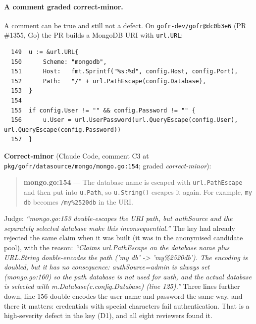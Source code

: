 \documentclass[11pt,a4paper]{article}
\newcommand{\code}[1]{\texttt{#1}}
\begin{document}
\paragraph{A comment graded correct-minor.} A comment can be true and
still not a defect. On \code{gofr-dev/\allowbreak{}gofr@dc0b3e6} (PR \#1355, Go) the PR
builds a MongoDB URI with \code{url.URL}:
{\scriptsize
\begin{verbatim}
  149  u := &url.URL{
  150      Scheme: "mongodb",
  151      Host:   fmt.Sprintf("%s:%d", config.Host, config.Port),
  152      Path:   "/" + url.PathEscape(config.Database),
  153  }
  154  
  155  if config.User != "" && config.Password != "" {
  156      u.User = url.UserPassword(url.QueryEscape(config.User), url.QueryEscape(config.Password))
  157  }
\end{verbatim}
}
\noindent\textbf{Correct-minor} (Claude Code, comment C3 at \code{pkg/\allowbreak{}gofr/\allowbreak{}datasource/\allowbreak{}mongo/\allowbreak{}mongo.go:154}; graded \emph{correct-minor}):
\begin{quote}\small
\textbf{mongo.go:154} --- The database name is escaped with \texttt{url.PathEscape} and then put into \texttt{u.Path}, so \texttt{u.String()} escapes it again. For example, \texttt{my db} becomes \texttt{/my\%2520db} in the URI.
\end{quote}
\noindent Judge: \emph{``mongo.go:153 double-escapes the URI path, but authSource and the separately selected database make this inconsequential.''} The key had already rejected the same claim when it was built (it was in the anonymised candidate pool), with the reason: \emph{``Claims url.PathEscape on the database name plus URL.String double-encodes the path ('my db' -\textgreater{} 'my\%2520db'). The encoding is doubled, but it has no consequence: authSource=admin is always set (mongo.go:160) so the path database is not used for auth, and the actual database is selected with m.Database(c.config.Database) (line 125).''}
Three lines further down, line 156 double-encodes the user name and password the same way, and there it matters: credentials with special characters fail authentication. That is a high-severity defect in the key (D1), and all eight reviewers found it.
\end{document}
